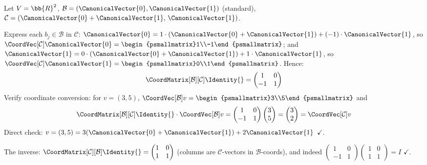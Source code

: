 \begin{example}
\label{ex:cob-R2}
    Let $V = \bb{R}^2$, $\mathcal{B} = (\CanonicalVector{0}, \CanonicalVector{1})$ (standard),
    $\mathcal{C} = (\CanonicalVector{0} + \CanonicalVector{1},\, \CanonicalVector{1})$.

    Express each $b_j \in \mathcal{B}$ in $\mathcal{C}$:
    $\CanonicalVector{0} = 1 \cdot (\CanonicalVector{0}+\CanonicalVector{1}) + (-1) \cdot \CanonicalVector{1}$, so
    $\CoordVec[\mathcal{C}]{\CanonicalVector{0}} = \begin{psmallmatrix}1\\-1\end{psmallmatrix}$; and
    $\CanonicalVector{1} = 0 \cdot (\CanonicalVector{0}+\CanonicalVector{1}) + 1 \cdot \CanonicalVector{1}$, so
    $\CoordVec[\mathcal{C}]{\CanonicalVector{1}} = \begin{psmallmatrix}0\\1\end{psmallmatrix}$.
    Hence:
    \[
        \CoordMatrix[\mathcal{B}][\mathcal{C}]{\Identity{}}
        = \begin{pmatrix} 1 & 0 \\ -1 & 1 \end{pmatrix}
    \]
    Verify coordinate conversion: for $v = (3,5)$,
    $\CoordVec[\mathcal{B}]{v} = \begin{psmallmatrix}3\\5\end{psmallmatrix}$ and
    \[
        \CoordMatrix[\mathcal{B}][\mathcal{C}]{\Identity{}}
        \cdot \CoordVec[\mathcal{B}]{v}
        = \begin{pmatrix}1&0\\-1&1\end{pmatrix}\begin{pmatrix}3\\5\end{pmatrix}
        = \begin{pmatrix}3\\2\end{pmatrix}
        = \CoordVec[\mathcal{C}]{v}
    \]
    Direct check: $v = (3,5) = 3(\CanonicalVector{0}+\CanonicalVector{1}) + 2 \CanonicalVector{1}$ $\checkmark$.

    The inverse:
    $\CoordMatrix[\mathcal{C}][\mathcal{B}]{\Identity{}}
    = \begin{pmatrix}1&0\\1&1\end{pmatrix}$ (columns are $\mathcal{C}$-vectors in
    $\mathcal{B}$-coords), and indeed
    $\begin{pmatrix}1&0\\-1&1\end{pmatrix}
     \begin{pmatrix}1&0\\1&1\end{pmatrix}
     = I$ $\checkmark$.
\end{example}

